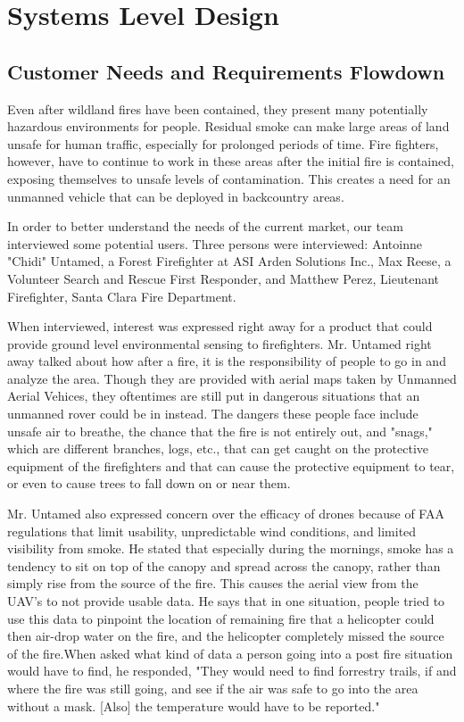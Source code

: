 \chapter{Systems Level Design}
\graphicspath{{images/}}
%
\section{Customer Needs and Requirements Flowdown}
Even after wildland fires have been contained, they present many potentially hazardous environments for people. Residual smoke can make large areas of land unsafe for human traffic, especially for prolonged periods of time. Fire fighters, however, have to continue to work in these areas after the initial fire is contained, exposing themselves to unsafe levels of contamination. This creates a need for an unmanned vehicle that can be deployed in backcountry areas. 

In order to better understand the needs of the current market, our team interviewed some potential users. Three persons were interviewed: Antoinne "Chidi" Untamed, a Forest Firefighter at ASI Arden Solutions Inc., Max Reese, a Volunteer Search and Rescue First Responder, and Matthew Perez, Lieutenant Firefighter, Santa Clara Fire Department. 

When interviewed, interest was expressed right away for a product that could provide ground level environmental sensing to firefighters. Mr. Untamed right away talked about how after a fire, it is the responsibility of people to go in and analyze the area. Though they are provided with aerial maps taken by Unmanned Aerial Vehices, they oftentimes are still put in dangerous situations that an unmanned rover could be in instead. The dangers these people face include unsafe air to breathe, the chance that the fire is not entirely out, and "snags," which are different branches, logs, etc., that can get caught on the protective equipment of the firefighters and that can cause the protective equipment to tear, or even to cause trees to fall down on or near them. 

Mr. Untamed also expressed concern over the efficacy of drones because of FAA regulations that limit usability, unpredictable wind conditions, and limited visibility from smoke. He stated that especially during the mornings, smoke has a tendency to sit on top of the canopy and spread across the canopy, rather than simply rise from the source of the fire. This causes the aerial view from the UAV's to not provide usable data. He says that in one situation, people tried to use this data to pinpoint the location of remaining fire that a helicopter could then air-drop water on the fire, and the helicopter completely missed the source of the fire.When asked what kind of data a person going into a post fire situation would have to find, he responded, "They would need to find forrestry trails, if and where the fire was still going, and see if the air was safe to go into the area without a mask. [Also] the temperature would have to be reported." 

